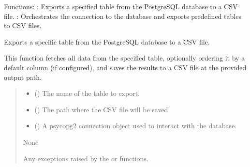\documentclass[letterpaper,10pt,english]{sphinxmanual}
\begin{document}
\sphinxAtStartPar
Functions:
\sphinxhyphen{} : Exports a specified table from the PostgreSQL database to a CSV file.
\sphinxhyphen{} : Orchestrates the connection to the database and exports predefined tables to CSV files.

\begin{fulllineitems}
\label{\detokenize{modules.data_storage:modules.data_storage.data_export.export_table_to_csv}}
\pysigstartsignatures
\pysiglinewithargsret
{}
{\sphinxparamcomma {}\sphinxparamcomma {}}
{}
\pysigstopsignatures
\sphinxAtStartPar
Exports a specific table from the PostgreSQL database to a CSV file.

\sphinxAtStartPar
This function fetches all data from the specified table, optionally ordering it
by a default column (if configured), and saves the results to a CSV file at the
provided output path.
\begin{quote}\begin{description}
\begin{itemize}
\item {} 
\sphinxAtStartPar
{} () \textendash{} The name of the table to export.

\item {} 
\sphinxAtStartPar
{} () \textendash{} The path where the CSV file will be saved.

\item {} 
\sphinxAtStartPar
{} () \textendash{} A psycopg2 connection object used to interact with the database.

\end{itemize}

\sphinxAtStartPar
None

\sphinxAtStartPar
Any exceptions raised by the  or  functions.

\end{description}\end{quote}

\end{fulllineitems}
\end{document}
